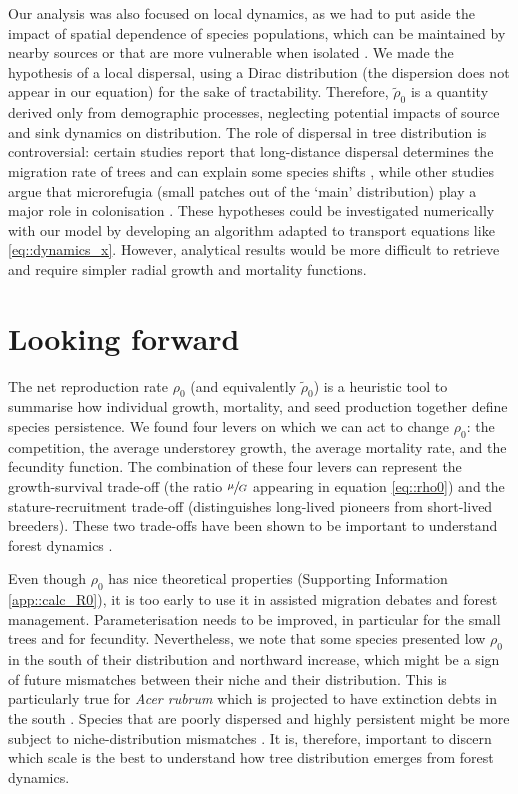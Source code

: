 Our analysis was also focused on local dynamics, as we had to put aside the impact of spatial dependence of species populations, which can be maintained by nearby sources or that are more vulnerable when isolated \citep{Pulliam2000}. We made the hypothesis of a local dispersal, using a Dirac distribution (\ie the dispersion does not appear in our equation) for the sake of tractability. Therefore, $ \tilde \rho_0 $ is a quantity derived only from demographic processes, neglecting potential impacts of source and sink dynamics on distribution. The role of dispersal in tree distribution is controversial: certain studies report that long-distance dispersal determines the migration rate of trees and can explain some species shifts \citep[and references therein]{Nathan2002}, while other studies argue that microrefugia (small patches out of the `main' distribution) play a major role in colonisation \citep[and references therein]{Feurdean2013}. These hypotheses could be investigated numerically with our model by developing an algorithm adapted to transport equations like \eqref{eq::dynamics_x}. However, analytical results would be more difficult to retrieve and require simpler radial growth and mortality functions.

\section{Looking forward}
The net reproduction rate $ \rho_0 $ (and equivalently $ \tilde \rho_0 $) is a heuristic tool to summarise how individual growth, mortality, and seed production together define species persistence. We found four levers on which we can act to change $ \rho_0 $: the competition, the average understorey growth, the average mortality rate, and the fecundity function. The combination of these four levers can represent the growth-survival trade-off (\eg the ratio $ \sfrac{\mu}{G} $ appearing in equation \eqref{eq::rho0}) and the stature-recruitment trade-off (distinguishes long-lived pioneers from short-lived breeders). These two trade-offs have been shown to be important to understand forest dynamics \citep[for tropical forest]{Ruger2020}. 

Even though $ \rho_0 $ has nice theoretical properties (Supporting Information \ref{app::calc_R0}), it is too early to use it in assisted migration debates and forest management. Parameterisation needs to be improved, in particular for the small trees and for fecundity. Nevertheless, we note that some species presented low $ \rho_0 $ in the south of their distribution and northward increase, which might be a sign of future mismatches between their niche and their distribution. This is particularly true for \textit{Acer rubrum} which is projected to have extinction debts in the south \citep{Talluto2017a}. Species that are poorly dispersed and highly persistent might be more subject to niche-distribution mismatches \citep[study on shrubs of the Proteaceae family in South Africa, not on trees]{Pagel2020}. It is, therefore, important to discern which scale is the best to understand how tree distribution emerges from forest dynamics.

